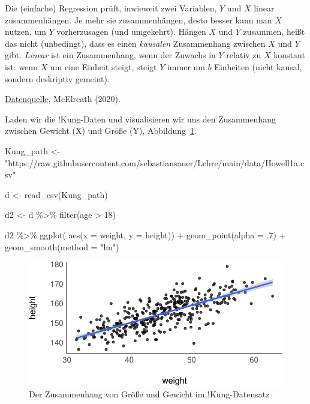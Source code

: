 \documentclass[
  a4paper,
  DIV=11]{scrreprt}
\newenvironment{Shaded}{\begin{snugshade}}{\end{snugshade}}
\newcommand{\AttributeTok}[1]{\textcolor[rgb]{0.40,0.45,0.13}{#1}}
\newcommand{\DecValTok}[1]{\textcolor[rgb]{0.68,0.00,0.00}{#1}}
\newcommand{\FunctionTok}[1]{\textcolor[rgb]{0.28,0.35,0.67}{#1}}
\newcommand{\NormalTok}[1]{\textcolor[rgb]{0.00,0.23,0.31}{#1}}
\newcommand{\OtherTok}[1]{\textcolor[rgb]{0.00,0.23,0.31}{#1}}
\newcommand{\SpecialCharTok}[1]{\textcolor[rgb]{0.37,0.37,0.37}{#1}}
\newcommand{\StringTok}[1]{\textcolor[rgb]{0.13,0.47,0.30}{#1}}
\theoremstyle{definition}
\theoremstyle{remark}
\begin{document}
Die (einfache) Regression prüft, inwieweit zwei Variablen, \(Y\) und
\(X\) linear zusammenhängen. Je mehr sie zusammenhängen, desto besser
kann man \(X\) nutzen, um \(Y\) vorherzusagen (und umgekehrt). Hängen
\(X\) und \(Y\) zusammen, heißt das nicht (unbedingt), dass es einen
\emph{kausalen} Zusammenhang zwischen \(X\) und \(Y\) gibt.
\emph{Linear} ist ein Zusammenhang, wenn der Zuwachs in \(Y\) relativ zu
\(X\) konstant ist: wenn \(X\) um eine Einheit steigt, steigt \(Y\)
immer um \(b\) Einheiten (nicht kausal, sondern deskriptiv gemeint).

\href{https://raw.githubusercontent.com/sebastiansauer/Lehre/main/data/Howell1a.csv}{Datenquelle},
McElreath (2020).

Laden wir die !Kung-Daten und visualisieren wir uns den Zusammenhang
zwischen Gewicht (X) und Größe (Y), Abbildung~\ref{fig-kung-zshg}.

\begin{Shaded}
\begin{Highlighting}[]
\NormalTok{Kung\_path }\OtherTok{\textless{}{-}} \StringTok{"https://raw.githubusercontent.com/sebastiansauer/Lehre/main/data/Howell1a.csv"}

\NormalTok{d }\OtherTok{\textless{}{-}} \FunctionTok{read\_csv}\NormalTok{(Kung\_path)  }

\NormalTok{d2 }\OtherTok{\textless{}{-}} 
\NormalTok{  d }\SpecialCharTok{\%\textgreater{}\%} 
  \FunctionTok{filter}\NormalTok{(age }\SpecialCharTok{\textgreater{}} \DecValTok{18}\NormalTok{) }

\NormalTok{d2 }\SpecialCharTok{\%\textgreater{}\%} 
  \FunctionTok{ggplot}\NormalTok{(}
       \FunctionTok{aes}\NormalTok{(}\AttributeTok{x =}\NormalTok{ weight, }\AttributeTok{y =}\NormalTok{ height)) }\SpecialCharTok{+}
  \FunctionTok{geom\_point}\NormalTok{(}\AttributeTok{alpha =}\NormalTok{ .}\DecValTok{7}\NormalTok{) }\SpecialCharTok{+}
  \FunctionTok{geom\_smooth}\NormalTok{(}\AttributeTok{method =} \StringTok{"lm"}\NormalTok{)}
\end{Highlighting}
\end{Shaded}

\begin{figure}[H]

{\centering \includegraphics{./lineare-modelle_files/figure-pdf/fig-kung-zshg-1.pdf}

}

\caption{\label{fig-kung-zshg}Der Zusammenhang von Größe und Gewicht im
!Kung-Datensatz}

\end{figure}
\end{document}
